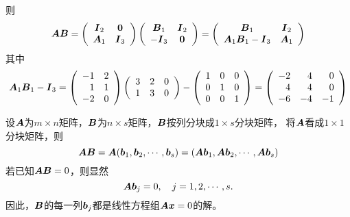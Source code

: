 \begin{frame}
  则
  $$
  \MA\MB = \left(
    \begin{array}{cc}
      \MI_2 & \M0\\
      \MA_1 & \MI_3
    \end{array}
  \right)\left(
    \begin{array}{cc}
      \MB_1 & \MI_2\\
      -\MI_3 & \M0
    \end{array}
  \right) = \left(
    \begin{array}{cc}
      \MB_1 & \MI_2\\
      \MA_1\MB_1-\MI_3 & \MA_1
    \end{array}
  \right)
  $$
  其中
  $$
  \boldsymbol{A}_1\boldsymbol{B}_1-\boldsymbol{I}_3 = \left(
    \begin{array}{rr}
      -1&2\\
      1&1\\
      -2&0
    \end{array}
  \right)\left(
    \begin{array}{rrr}
      3&2&0\\
      1&3&0
    \end{array}
  \right)-\left(
    \begin{array}{ccc}
      1&0&0\\
      0&1&0\\
      0&0&1
    \end{array}
  \right)=\left(
    \begin{array}{rrr}
      -2&4&0\\
      4&4&0\\
      -6&-4&-1
    \end{array}
  \right)
  $$
\end{frame}

\begin{frame}

  \begin{li}
    设$\boldsymbol{A}$为$m\times n$矩阵，$\boldsymbol{B}$为$n\times s$矩阵，$\boldsymbol{B}$按列分块成$1\times s$分块矩阵，
    将$\boldsymbol{A}$看成$1\times 1$分块矩阵，则
    $$
    \boldsymbol{A}\boldsymbol{B}=\boldsymbol{A}({\boldsymbol{b}}_1,{\boldsymbol{b}}_2,\cdots,{\boldsymbol{b}}_s)=(\boldsymbol{A}{\boldsymbol{b}}_1,\boldsymbol{A}{\boldsymbol{b}}_2,\cdots,\boldsymbol{A}{\boldsymbol{b}}_s)      
    $$
    若已知$\boldsymbol{A}\boldsymbol{B}=0$，则显然
    $$
    \boldsymbol{A}{\boldsymbol{b}}_j=0, \quad j=1,2,\cdots,s.
    $$
    因此，$\boldsymbol{B}$的每一列${\boldsymbol{b}}_j$都是线性方程组$\boldsymbol{A}{\boldsymbol{x}}=0$的解。
  \end{li}    
\end{frame}

